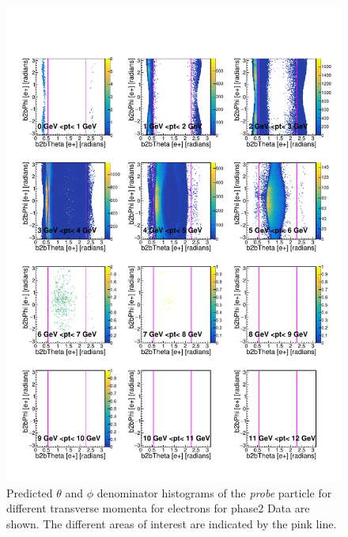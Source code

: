 \documentclass[a4paper,11pt,twosided,final,german,openbib,pdftex,listof=totoc,bibliography=totoc]{scrbook}
\begin{document}
\begin{appendix}
\begin{figure}[h!]
	\includegraphics[width=\textwidth]{Plots/RTPtMemD_Data.pdf}
	\caption[Denominator $\theta$-$\phi$ Electron Transverse Momentum Phase2 Data]{Predicted $\theta$ and $\phi$ denominator histograms of the \textit{probe} particle for different transverse momenta for electrons for phase2 Data are shown. The different areas of interest are indicated by the pink line.}
	\label{plt:RTPtMemD_Data}
\end{figure}






\end{appendix}
\end{document}
